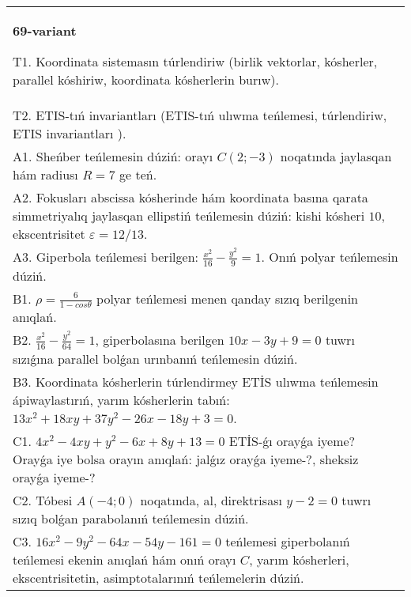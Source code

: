 \documentclass{article}
\begin{document}
\begin{tabular}{m{17cm}}
\textbf{69-variant}
\newline

T1. Koordinata sistemasın túrlendiriw (birlik vektorlar, kósherler, parallel kóshiriw, koordinata kósherlerin burıw).\\

T2. ETIS-tıń invariantları (ETIS-tıń ulıwma teńlemesi, túrlendiriw, ETIS invariantları ).\\

A1. Sheńber teńlemesin dúziń: orayı $C (2;-3) $ noqatında jaylasqan hám radiusı $R=7$ ge teń.\\

A2. Fokusları abscissa kósherinde hám koordinata basına qarata simmetriyalıq jaylasqan ellipstiń teńlemesin dúziń: kishi kósheri $10$, ekscentrisitet $\varepsilon=12/13$.\\

A3. Giperbola teńlemesi berilgen: $\frac{x^{2}}{16}-\frac{y^{2}}{9}=1$. Onıń polyar teńlemesin dúziń.\\

B1. $\rho = \frac{6}{1 - cos\theta}$ polyar teńlemesi menen qanday sızıq berilgenin anıqlań.  \\

B2. $\frac{x^{2}}{16} - \frac{y^{2}}{64} = 1$, giperbolasına berilgen $10x - 3y + 9 = 0$ tuwrı sızıǵına parallel bolǵan urınbanıń teńlemesin dúziń.  \\

B3. Koordinata kósherlerin túrlendirmey ETİS ulıwma teńlemesin ápiwaylastırıń, yarım kósherlerin tabıń: $13x^{2} + 18xy + 37y^{2} - 26x - 18y + 3 = 0$.  \\

C1. $4x^{2} - 4xy + y^{2} - 6x + 8y + 13 = 0$ ETİS-ǵı orayǵa iyeme? Orayǵa iye bolsa orayın anıqlań: jalǵız orayǵa iyeme-?, sheksiz orayǵa iyeme-?  \\

C2. Tóbesi $A(-4;0)$ noqatında, al, direktrisası $y - 2 = 0$ tuwrı sızıq bolǵan parabolanıń teńlemesin dúziń.\\

C3. $16x^{2} - 9y^{2} - 64x - 54y - 161 = 0$ teńlemesi giperbolanıń teńlemesi ekenin anıqlań hám onıń orayı $C$, yarım kósherleri, ekscentrisitetin, asimptotalarınıń teńlemelerin dúziń.  \\

\end{tabular}
\vspace{1cm}
\end{document}
